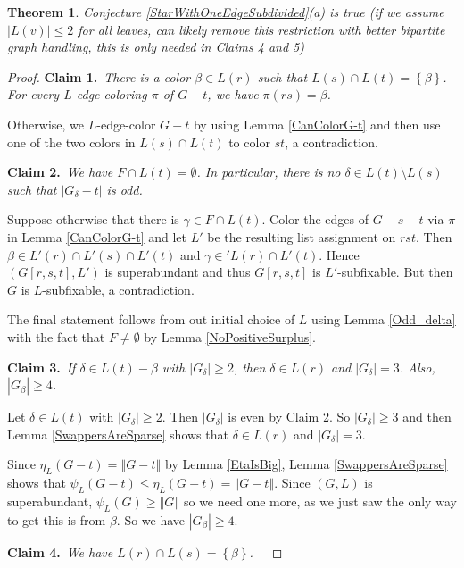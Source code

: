 \documentclass[12pt]{article}
\theoremstyle{plain}
\newtheorem{thm}{Theorem}[section]
\theoremstyle{definition}
\theoremstyle{remark}
\newcommand{\set}[1]{\left\{ #1 \right\}}
\newcommand{\size}[1]{\left\Vert#1\right\Vert}
\newcommand{\claim}[2]{{\bf Claim #1.}~{\it #2}~~}
\begin{document}
	\begin{thm}
		Conjecture \ref{StarWithOneEdgeSubdivided}(a) is true (if we assume $|L(v)| \le 2$ for all leaves, can likely remove this restriction with better bipartite graph handling, this is only needed in Claims 4 and 5)
	\end{thm}
	\begin{proof}
	
		\claim{1}{There is a color $\beta \in L(r)$ such that $L(s) \cap L(t) = \set{\beta}$.  For every $L$-edge-coloring $\pi$ of $G-t$, we have $\pi(rs) = \beta$.}
		
		Otherwise, we $L$-edge-color $G-t$ by using Lemma \ref{CanColorG-t} and then use one of the two colors in $L(s) \cap L(t)$ to color $st$, a contradiction. 
		
		\claim{2}{We have $F \cap L(t) = \emptyset$.  In particular, there is no $\delta \in L(t) \setminus L(s)$ such that $|G_\delta - t|$ is odd.}
		
		Suppose otherwise that there is $\gamma \in F \cap L(t)$.  Color the edges of $G - s - t$ via $\pi$ in Lemma \ref{CanColorG-t} and let $L'$ be the resulting list assignment on $rst$.  Then $\beta \in L'(r) \cap L'(s) \cap L'(t)$ and $\gamma \in 'L(r) \cap L'(t)$.  Hence $(G[r,s,t], L')$ is superabundant and thus $G[r,s,t]$ is $L'$-subfixable.  But then $G$ is $L$-subfixable, a contradiction.
		
		The final statement follows from out initial choice of $L$ using Lemma \ref{Odd_delta} with the fact that $F \ne \emptyset$ by Lemma \ref{NoPositiveSurplus}.
		
		\claim{3}{If $\delta \in L(t) - \beta$ with $|G_\delta| \ge 2$, then $\delta \in L(r)$ and $|G_\delta| = 3$.  Also, $|G_\beta| \ge 4$.}
		
		Let $\delta \in L(t)$ with $|G_\delta| \ge 2$.  Then $|G_\delta|$ is even by Claim 2.  So $|G_\delta| \ge 3$ and then Lemma \ref{SwappersAreSparse} shows that $\delta \in L(r)$ and $|G_\delta| = 3$.  
		
		Since $\eta_L(G-t) = \size{G-t}$ by Lemma \ref{EtaIsBig}, Lemma \ref{SwappersAreSparse} shows that $\psi_L(G-t) \le \eta_L(G-t) = \size{G-t}$.  Since $(G,L)$ is superabundant, $\psi_L(G) \ge \size{G}$ so we need one more, as we just saw the only way to get this is from $\beta$.  So we have $|G_\beta| \ge 4$.
		
		\claim{4}{We have $L(r) \cap L(s) = \set{\beta}$.}
		

\end{proof}
\end{document}
